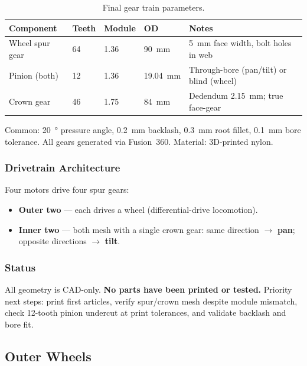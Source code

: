 \documentclass[12pt,a4paper]{article}
\begin{document}
\begin{table}[H]
	\centering
	\caption{Final gear train parameters.}
	\label{tab:final-params}
	\begin{tabular}{llllp{4.0cm}}
		\toprule
		\textbf{Component} & \textbf{Teeth} & \textbf{Module} & \textbf{OD} & \textbf{Notes} \\
		\midrule
		Wheel spur gear & 64 & \num{1.36} & \SI{90}{mm} &
		\SI{5}{mm} face width, bolt holes in web \\
		\addlinespace
		Pinion (both) & 12 & \num{1.36} & \SI{19.04}{mm} &
		Through-bore (pan/tilt) or blind (wheel) \\
		\addlinespace
		Crown gear & 46 & \num{1.75} & \SI{84}{mm} &
		Dedendum \SI{2.15}{mm}; true face-gear \\
		\bottomrule
	\end{tabular}
\end{table}

Common: \SI{20}{\degree} pressure angle, \SI{0.2}{mm} backlash, \SI{0.3}{mm} root fillet, \SI{0.1}{mm} bore tolerance. All gears generated via Fusion~360. Material: 3D-printed nylon.

\subsubsection{Drivetrain Architecture}

Four motors drive four spur gears:
\begin{itemize}
	\item \textbf{Outer two} --- each drives a wheel (differential-drive locomotion).
	\item \textbf{Inner two} --- both mesh with a single crown gear:
	      same direction $\rightarrow$ \textbf{pan};
	      opposite directions $\rightarrow$ \textbf{tilt}.
\end{itemize}

\subsubsection{Status}

All geometry is CAD-only. \textbf{No parts have been printed or tested.} Priority next steps: print first articles, verify spur/crown mesh despite module mismatch, check 12-tooth pinion undercut at print tolerances, and validate backlash and bore fit.

\subsection{Outer Wheels}
\end{document}
